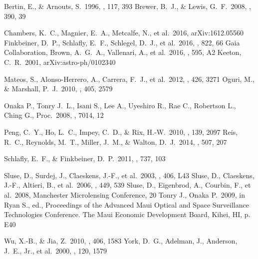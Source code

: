 \documentclass[manuscript]{aastex}
\begin{document}
\begin{thebibliography}{}


 Bertin, E., \& Arnouts, S.\ 1996, \aaps, 117, 393 
 Brewer, B.~J., \& Lewis, G.~F.\ 2008, \mnras, 390, 39 

 Chambers, K.~C., Magnier, E.~A., Metcalfe, N., et al.\ 2016, arXiv:1612.05560 
 Finkbeiner, D.~P., Schlafly, E.~F., Schlegel, D.~J., et al.\ 2016, \apj, 822, 66
 Gaia Collaboration, Brown, A.~G.~A., Vallenari, A., et al.\ 2016, \aap, 595, A2 
 Keeton, C.~R.\ 2001, arXiv:astro-ph/0102340 

 Mateos, S., Alonso-Herrero, A., Carrera, F.~J., et al.\ 2012, \mnras, 426, 3271 
 Oguri, M., \& Marshall, P.~J.\ 2010, \mnras, 405, 2579 

 Onaka P., Tonry J.~L., Isani S., Lee A., Uyeshiro R., Rae C., Robertson L., Ching G., Proc.\ 2008, \procspie, 7014, 12

 Peng, C.~Y., Ho, L.~C., Impey, C.~D., \& Rix, H.-W.\ 2010, \aj, 139, 2097 
 Reis, R.~C., Reynolds, M.~T., Miller, J.~M., \& Walton, D.~J.\ 2014, \nat, 507, 207 

 Schlafly, E.~F., \& Finkbeiner, D.~P.\ 2011, \apj, 737, 103 

 Sluse, D., Surdej, J., Claeskens, J.-F., et al.\ 2003, \aap, 406, L43 
 Sluse, D., Claeskens, J.-F., Altieri, B., et al.\ 2006, \aap, 449, 539 
 Sluse, D., Eigenbrod, A., Courbin, F., et al.\ 2008, Manchester Microlensing Conference, 20 
 Tonry J., Onaka P.\ 2009, in Ryan S., ed., 
Proceedings of the Advanced Maui Optical and Space Surveillance Technologies Conference.
The Maui Economic Development Board, Kihei, HI, p. E40

 Wu, X.-B., \& Jia, Z.\ 2010, \mnras, 406, 1583 
 York, D.~G., Adelman, J., Anderson, J.~E., Jr., et al.\ 2000, \aj, 120, 1579 


\clearpage



\end{thebibliography}
\end{document}
